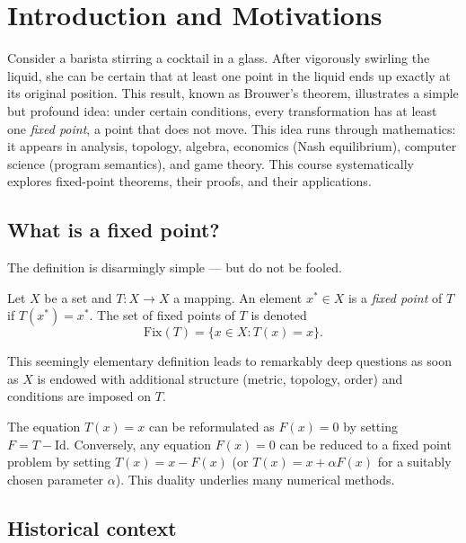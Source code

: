 \chapter{Introduction and Motivations}\label{ch:introduction}

Consider a barista stirring a cocktail in a glass. After vigorously swirling
the liquid, she can be certain that at least one point in the liquid ends up
exactly at its original position. This result, known as Brouwer's theorem,
illustrates a simple but profound idea: under certain conditions, every
transformation has at least one \emph{fixed point}, a point that does not
move. This idea runs through mathematics: it appears in analysis, topology,
algebra, economics (Nash equilibrium), computer science (program semantics),
and game theory. This course systematically explores fixed-point theorems,
their proofs, and their applications.

\section{What is a fixed point?}

The definition is disarmingly simple --- but do not be fooled.

\begin{definition}
Let $X$ be a set and $T : X \to X$ a mapping. An element $x^* \in X$ is a
\emph{fixed point} of $T$ if $T(x^*) = x^*$. The set of fixed points of $T$
is denoted
\[
    \mathrm{Fix}(T) = \{ x \in X : T(x) = x \}.
\]
\end{definition}

This seemingly elementary definition leads to remarkably deep questions as
soon as $X$ is endowed with additional structure (metric, topology, order) and
conditions are imposed on $T$.

\begin{remark}
The equation $T(x) = x$ can be reformulated as $F(x) = 0$ by setting
$F = T - \mathrm{Id}$. Conversely, any equation $F(x) = 0$ can be reduced to a
fixed point problem by setting $T(x) = x - F(x)$ (or $T(x) = x + \alpha F(x)$
for a suitably chosen parameter $\alpha$). This duality underlies many
numerical methods.
\end{remark}

\section{Historical context}

